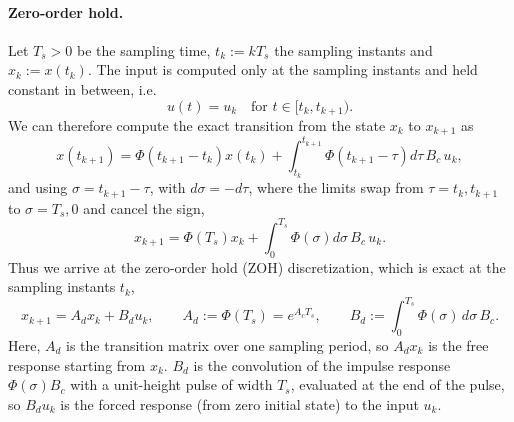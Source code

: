 \paragraph{Zero-order hold.}
Let $T_s > 0$ be the sampling time, $t_k := k T_s$ the sampling instants and $x_k := x(t_k)$.
The input is computed only at the sampling instants and held constant in between, i.e.
\[
    u(t) = u_k \quad \text{for } t\in[t_k, t_{k+1}) .
\]
We can therefore compute the exact transition from the state $x_k$ to $x_{k+1}$ as
\[
    x(t_{k+1}) = \Phi(t_{k+1}-t_k)x(t_k) + \int_{t_k}^{t_{k+1}} \Phi(t_{k+1}-\tau) d\tau\, B_c\, u_k,
\]
and using $\sigma = t_{k+1} - \tau$, with $d\sigma = -d\tau$, where the limits swap from $\tau = t_k, t_{k+1}$ to $\sigma = T_s, 0$ and cancel the sign,
\begin{equation} \label{eq:zoh}
    x_{k+1} = \Phi(T_s)x_k + \int_{0}^{T_s} \Phi(\sigma) d\sigma\, B_c\, u_k .
\end{equation}
Thus we arrive at the zero-order hold (ZOH) discretization, which is exact at the sampling instants $t_k$,
\[
    x_{k+1} = A_dx_k + B_du_k ,
    \qquad
    A_d := \Phi(T_s) = e^{A_c T_s},
    \qquad
    B_d := \int_0^{T_s} \Phi(\sigma)\, d\sigma\, B_c .
\]
Here, $A_d$ is the transition matrix over one sampling period, so $A_d x_k$ is the free response starting from $x_k$.
$B_d$ is the convolution of the impulse response $\Phi(\sigma)B_c$ with a unit-height pulse of width $T_s$, evaluated at the end of the pulse, so $B_d u_k$ is the forced response (from zero initial state) to the input $u_k$.

